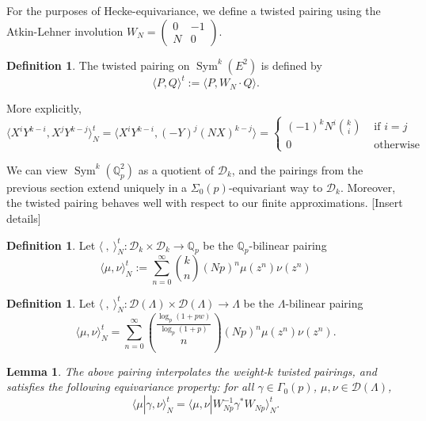 \documentclass[10pt]{amsart}
\theoremstyle{plain}
\newtheorem{lemma}[theorem]{Lemma}
\theoremstyle{definition}
\newtheorem{definition}[theorem]{Definition}
\newcommand{\QQ}{{\mathbb{Q}}}
\newcommand{\cD}{\mathcal{D}}
\DeclareMathOperator{\Sym}{Sym}
\begin{document}
For the purposes of Hecke-equivariance, we define a twisted pairing using the Atkin-Lehner involution $W_N = \begin{pmatrix} 0 & -1 \\ N & 0 \end{pmatrix}$.
\begin{definition}
The twisted pairing on $\Sym^k(E^2)$ is defined by
\begin{equation}
	\langle P, Q\rangle^t := \langle P, W_N \cdot Q\rangle.
\end{equation}
\end{definition}
More explicitly,
\begin{equation*}
	\langle X^iY^{k-i}, X^j Y^{k-j} \rangle_N^t = \langle X^i Y^{k-i}, (-Y)^j(NX)^{k-j}\rangle= \begin{cases} (-1)^k N^i {k \choose i} & \text{ if } i=j\\
												0	& \text{ otherwise} \end{cases}
\end{equation*}

We can view $\Sym^k(\QQ_p^2)$ as a quotient of $\cD_k$, and the pairings from the previous section extend uniquely in a $\Sigma_0(p)$-equivariant way to $\cD_k$. Moreover, the twisted pairing behaves well with respect to our finite approximations. [Insert details]

\begin{definition}
Let $\langle~,~\rangle^t_N : \cD_k\times\cD_k\longrightarrow \QQ_p$ be the $\QQ_p$-bilinear pairing
\begin{equation}
	\langle \mu, \nu \rangle_N^t := \sum_{n=0}^\infty {k \choose n} (Np)^n \mu(z^n)\nu(z^n)
\end{equation}
\end{definition}




\begin{definition}
Let $\langle ~, ~\rangle^t_N :\cD(\Lambda)\times\cD(\Lambda) \longrightarrow \Lambda$ be the $\Lambda$-bilinear pairing
\begin{equation}
	\langle \mu, \nu \rangle_N^t = \sum_{n=0}^\infty {\frac{\log_p(1+pw)}{\log_p(1+p)} \choose n} (Np)^n \mu(z^n)\nu(z^n).
\end{equation}
\end{definition}

\begin{lemma}
The above pairing interpolates the weight-$k$ twisted pairings, and satisfies the following equivariance property: for all $\gamma \in\Gamma_0(p)$, $\mu,\nu\in \cD(\Lambda)$, 
\begin{equation}
	\langle \mu | \gamma, \nu\rangle_N^t  = \langle \mu, \nu| W_{Np}^{-1}\gamma^* W_{Np}\rangle_N^t.
\end{equation}	
\end{lemma}
\end{document}
